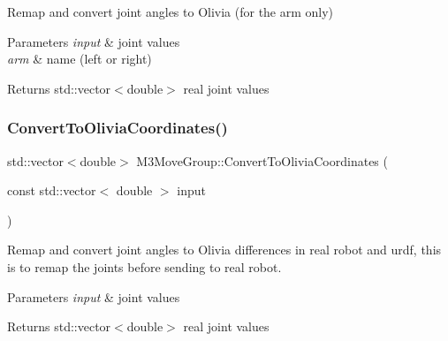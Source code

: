 Remap and convert joint angles to Olivia (for the arm only) 


\begin{DoxyParams}{Parameters}
{\em input} & joint values \\
\hline
{\em arm} & name (left or right) \\
\hline
\end{DoxyParams}
\begin{DoxyReturn}{Returns}
std\+::vector$<$double$>$ real joint values 
\end{DoxyReturn}
\mbox{\label{classM3MoveGroup_a76eed72085b10fa6fea6f9cc773a7901}} 
\subsubsection{\texorpdfstring{Convert\+To\+Olivia\+Coordinates()}{ConvertToOliviaCoordinates()}\hspace{0.1cm}{\footnotesize\ttfamily [1/2]}}
{\footnotesize\ttfamily std\+::vector$<$double$>$ M3\+Move\+Group\+::\+Convert\+To\+Olivia\+Coordinates (\begin{DoxyParamCaption}\item[{const std\+::vector$<$ double $>$}]{input }\end{DoxyParamCaption})\hspace{0.3cm}{\ttfamily [inline]}}



Remap and convert joint angles to Olivia differences in real robot and urdf, this is to remap the joints before sending to real robot. 


\begin{DoxyParams}{Parameters}
{\em input} & joint values \\
\hline
\end{DoxyParams}
\begin{DoxyReturn}{Returns}
std\+::vector$<$double$>$ real joint values 
\end{DoxyReturn}
\mbox{\label{classM3MoveGroup_a76eed72085b10fa6fea6f9cc773a7901}} 
